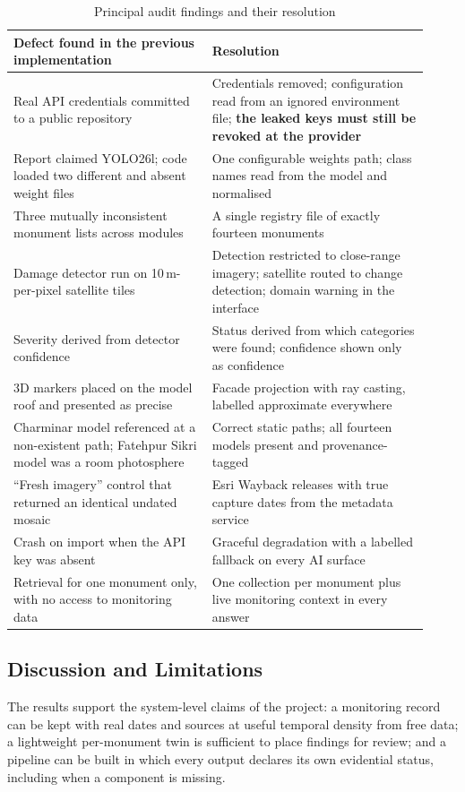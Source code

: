 \documentclass[a4paper,12pt,oneside]{book}
\begin{document}
\begin{table}[H]
\centering
\caption{Principal audit findings and their resolution}
\label{tab:audit}
\renewcommand{\arraystretch}{1.2}
{\footnotesize
\begin{tabular}{|p{0.44\linewidth}|p{0.48\linewidth}|}
\hline
\textbf{Defect found in the previous implementation} & \textbf{Resolution} \\ \hline
Real API credentials committed to a public repository & Credentials removed; configuration read from an ignored environment file; \textbf{the leaked keys must still be revoked at the provider} \\ \hline
Report claimed YOLO26l; code loaded two different and absent weight files & One configurable weights path; class names read from the model and normalised \\ \hline
Three mutually inconsistent monument lists across modules & A single registry file of exactly fourteen monuments \\ \hline
Damage detector run on 10\,m-per-pixel satellite tiles & Detection restricted to close-range imagery; satellite routed to change detection; domain warning in the interface \\ \hline
Severity derived from detector confidence & Status derived from which categories were found; confidence shown only as confidence \\ \hline
3D markers placed on the model roof and presented as precise & Facade projection with ray casting, labelled approximate everywhere \\ \hline
Charminar model referenced at a non-existent path; Fatehpur Sikri model was a room photosphere & Correct static paths; all fourteen models present and provenance-tagged \\ \hline
``Fresh imagery'' control that returned an identical undated mosaic & Esri Wayback releases with true capture dates from the metadata service \\ \hline
Crash on import when the API key was absent & Graceful degradation with a labelled fallback on every AI surface \\ \hline
Retrieval for one monument only, with no access to monitoring data & One collection per monument plus live monitoring context in every answer \\ \hline
\end{tabular}}
\end{table}

\subsection{Discussion and Limitations}
The results support the system-level claims of the project: a monitoring record can be kept with real dates and sources at useful temporal density from free data; a lightweight per-monument twin is sufficient to place findings for review; and a pipeline can be built in which every output declares its own evidential status, including when a component is missing.
\end{document}
